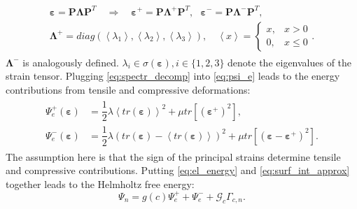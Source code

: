 \begin{align} \label{eq:spectr_decomp}
	\begin{aligned}
		\bm{\varepsilon} = \mathbf{P}\bm{\Lambda}\mathbf{P}^{T} \quad \Rightarrow \quad \bm{\varepsilon}^{+} = \mathbf{P}\bm{\Lambda}^{+}\mathbf{P}^{T}, \text{ } \bm{\varepsilon}^{-} = \mathbf{P}\bm{\Lambda}^{-}\mathbf{P}^{T}, \\
		\bm{\Lambda}^{+}=diag\left(\left<\lambda_{1}\right>,\left<\lambda_{2}\right>,\left<\lambda_{3}\right>\right), \quad \left<x\right>=\begin{cases}x, &x>0 \\ 0, & x\leq0\end{cases}.
	\end{aligned}
\end{align}
$\bm{\Lambda}^{-}$ is analogously                                                                                                                                                                                                                                                                                                                                                                                                                                                                                                          defined. $\lambda_{i}\in\sigma\left(\bm{\varepsilon}\right),i\in\{1,2,3\}$ denote the eigenvalues of the strain tensor. Plugging \eqref{eq:spectr_decomp} into \eqref{eq:psi_e} leads to the energy contributions from tensile and compressive deformations:
\begin{align} \label{eq:psi_e+-}
	\begin{aligned}
		\Psi_{e}^{+}\left(\bm{\varepsilon}\right) &= \dfrac{1}{2}\lambda\left<tr\left(\bm{\varepsilon}\right)\right>^{2}+\mu tr\left[\left(\bm{\varepsilon}^{+}\right)^{2}\right], \\
		\Psi_{e}^{-}\left(\bm{\varepsilon}\right) &= \dfrac{1}{2}\lambda\left(tr\left(\bm{\varepsilon}\right)-\left<tr\left(\bm{\varepsilon}\right)\right>\right)^{2}+\mu tr\left[\left(\bm{\varepsilon}-\bm{\varepsilon}^{+}\right)^{2}\right].
	\end{aligned}
\end{align}
The assumption here is that the sign of the principal strains determine tensile and compressive contributions. Putting \eqref{eq:el_energy} and \eqref{eq:surf_int_approx} together leads to the Helmholtz free energy:
\begin{equation} \label{eq:Helmholtz}
	\Psi_{n}=g\left(c\right)\Psi_{e}^{+}+\Psi_{e}^{-}+\mathcal{G}_{c}\Gamma_{c,n}.
\end{equation}

